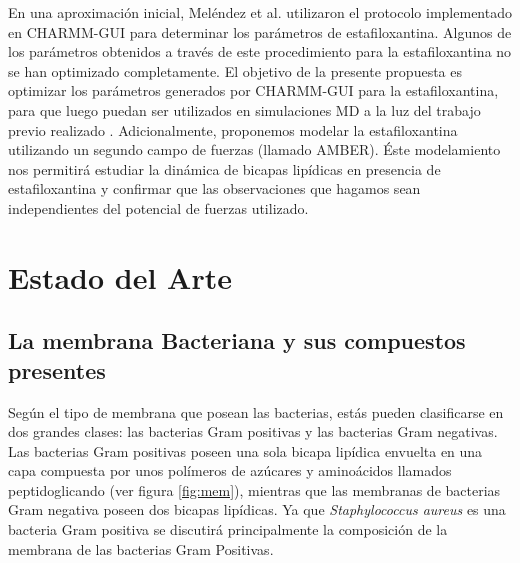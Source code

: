 \documentclass[12pt]{article}
\begin{document}
En una aproximación inicial, Meléndez et al. \cite{MelendezDelgado2018StudyingBilayers} utilizaron el protocolo implementado en CHARMM-GUI \cite{Sunhwan2008CHARMM-GUI:CHARMM} para determinar los parámetros de estafiloxantina. Algunos de los parámetros obtenidos a través de este procedimiento para la estafiloxantina no se han optimizado completamente. El objetivo de la  presente propuesta es optimizar los parámetros generados por CHARMM-GUI para la estafiloxantina, para que luego puedan ser utilizados en simulaciones MD a la luz del trabajo previo realizado \cite{MelendezDelgado2018StudyingBilayers}. Adicionalmente, proponemos modelar la estafiloxantina utilizando un segundo campo de fuerzas (llamado AMBER). Éste modelamiento nos permitirá estudiar la dinámica de bicapas lipídicas en presencia de estafiloxantina y confirmar que las observaciones que hagamos sean independientes del potencial de fuerzas utilizado.\\


\section{Estado del Arte}
\subsection{La membrana Bacteriana y sus compuestos presentes}\label{ss:mem}
Según el tipo de membrana que posean las bacterias, estás pueden clasificarse en dos grandes clases: las bacterias Gram positivas y las bacterias Gram negativas. Las bacterias Gram positivas poseen una sola bicapa lipídica envuelta en una capa compuesta por unos polímeros de azúcares y aminoácidos llamados peptidoglicando (ver figura \ref{fig:mem}), mientras que las membranas de bacterias Gram negativa poseen dos bicapas lipídicas. Ya que \textit{Staphylococcus aureus} es una bacteria Gram positiva se discutirá principalmente la composición de la membrana de las bacterias Gram Positivas.\\
\end{document}
